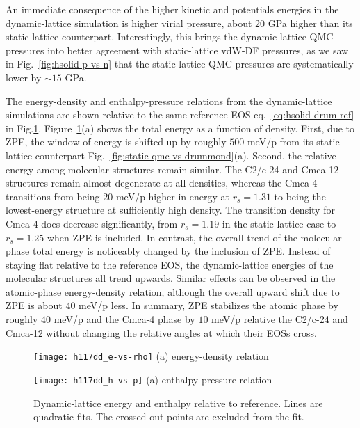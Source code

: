 An immediate consequence of the higher kinetic and potentials energies in the dynamic-lattice simulation is higher virial pressure, about $20$ GPa higher than its static-lattice counterpart.
Interestingly, this brings the dynamic-lattice QMC pressures into better agreement with static-lattice vdW-DF pressures, as we saw in Fig.~\ref{fig:hsolid-p-vs-n} that the static-lattice QMC pressures are systematically lower by $\sim 15$ GPa.

The energy-density and enthalpy-pressure relations from the dynamic-lattice simulations are shown relative to the same reference EOS eq.~\ref{eq:hsolid-drum-ref} in Fig.\ref{fig:dynamic-qmc-vs-drummond}.
Figure~\ref{fig:dynamic-qmc-vs-drummond}(a) shows the total energy as a function of density.
First, due to ZPE, the window of energy is shifted up by roughly $500$ meV/p from its static-lattice counterpart Fig.~\ref{fig:static-qmc-vs-drummond}(a).
Second, the relative energy among molecular structures remain similar.
The C2/c-24 and Cmca-12 structures remain almost degenerate at all densities, whereas the Cmca-4 transitions from being $20$ meV/p higher in energy at $r_s=1.31$ to being the lowest-energy structure at sufficiently high density.
The transition density for Cmca-4 does decrease significantly, from $r_s=1.19$ in the static-lattice case to $r_s=1.25$ when ZPE is included.
In contrast, the overall trend of the molecular-phase total energy is noticeably changed by the inclusion of ZPE.
Instead of staying flat relative to the reference EOS, the dynamic-lattice energies of the molecular structures all trend upwards.
Similar effects can be observed in the atomic-phase energy-density relation, although the overall upward shift due to ZPE is about $40$ meV/p less.
In summary, ZPE stabilizes the atomic phase by roughly $40$ meV/p and the Cmca-4 phase by $10$ meV/p relative the C2/c-24 and Cmca-12 without changing the relative angles at which their EOSs cross.

\begin{figure}[h]
\begin{minipage}{0.49\textwidth}
\centering
\texttt{[image: h117dd\_e-vs-rho]}
(a) energy-density relation
\end{minipage}
\begin{minipage}{0.49\textwidth}
\centering
\texttt{[image: h117dd\_h-vs-p]}
(a) enthalpy-pressure relation
\end{minipage}
\caption{Dynamic-lattice energy and enthalpy relative to reference. Lines are quadratic fits. The crossed out points are excluded from the fit.}
\label{fig:dynamic-qmc-vs-drummond}
\end{figure}

